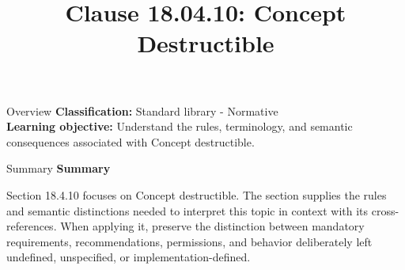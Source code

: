 \documentclass[10pt,letterpaper]{article}
\title{Clause 18.04.10: Concept Destructible}
\author{}
\date{}
\begin{document}
\maketitle
\begin{CornellOverviewBox}{Overview}
\textbf{Classification:} Standard library - Normative\\[2pt]
\textbf{Learning objective:} Understand the rules, terminology, and semantic consequences associated with Concept destructible.
\end{CornellOverviewBox}\begin{CornellSummaryBox}{Summary}
{\sffamily\bfseries\color{Accent} Summary}\par\vspace{3pt}Section 18.4.10 focuses on Concept destructible. The section supplies the rules and semantic distinctions needed to interpret this topic in context with its cross-references. When applying it, preserve the distinction between mandatory requirements, recommendations, permissions, and behavior deliberately left undefined, unspecified, or implementation-defined.
\end{CornellSummaryBox}
\end{document}
